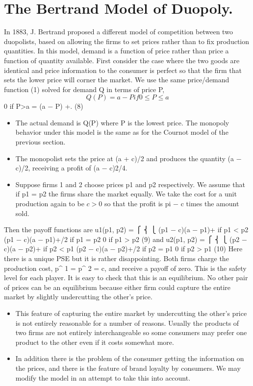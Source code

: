\documentclass[]{article}
\begin{document}
\newpage
\section{The Bertrand Model of Duopoly.} In 1883, J. Bertrand proposed a different
model of competition between two duopolists, based on allowing the firms to set prices
rather than to fix production quantities. In this model, demand is a function of price
rather than price a function of quantity available.
First consider the case where the two goods are identical and price information to the
consumer is perfect so that the firm that sets the lower price will corner the market. We
use the same price/demand function (1) solved for demand Q in terms of price P,
\[Q(P) = a − P if 0 \leq P \leq a\]
0 if P>a = (a − P)
+. (8)
\begin{itemize}
    \item The actual demand is Q(P) where P is the lowest price. The monopoly behavior under this
model is the same as for the Cournot model of the previous section. 
\item The monopolist sets
the price at (a + c)/2 and produces the quantity (a − c)/2, receiving a profit of (a − c)2/4.
\item Suppose firms 1 and 2 choose prices p1 and p2 respectively. We assume that if p1 = p2
the firms share the market equally. We take the cost for a unit production again to be
$c > 0$ so that the profit is pi − c times the amount sold.
\end{itemize}
 Then the payoff functions are
u1(p1, p2) =
⎧
⎨
⎩
(p1 − c)(a − p1)+ if p1 < p2
(p1 − c)(a − p1)+/2 if p1 = p2
0 if p1 > p2
(9)
and
u2(p1, p2) =
⎧
⎨
⎩
(p2 − c)(a − p2)+ if p2 < p1
(p2 − c)(a − p2)+/2 if p2 = p1
0 if p2 > p1
(10)
Here there is a unique PSE but it is rather disappointing. Both firms charge the production
cost, p^{\ast}
1 = p^{\ast}
2 = c, and receive a payoff of zero. This is the safety level for each player. It
is easy to check that this is an equilibrium. No other pair of prices can be an equilibrium
because either firm could capture the entire market by slightly undercutting the other’s
price.
\begin{itemize}
    \item This feature of capturing the entire market by undercutting the other’s price is not
entirely reasonable for a number of reasons. Usually the products of two firms are not
entirely interchangeable so some consumers may prefer one product to the other even if
it costs somewhat more.
\item In addition there is the problem of the consumer getting the
information on the prices, and there is the feature of brand loyalty by consumers. We may
modify the model in an attempt to take this into account.
\end{itemize}
\end{document}
